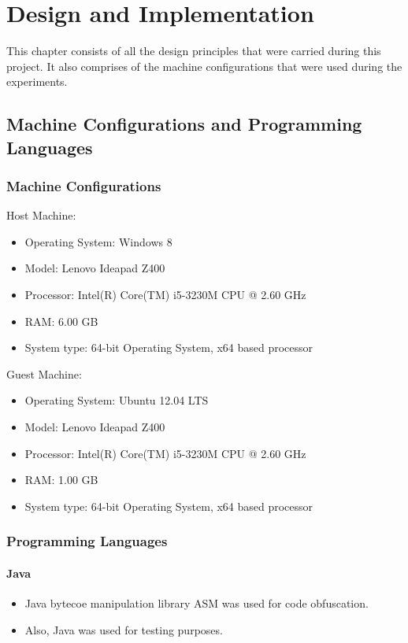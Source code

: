 \chapter{Design and Implementation}
This chapter consists of all the design principles that were carried during this project. It also comprises of the machine configurations that were used during the experiments.

\section{Machine Configurations and Programming Languages}
\subsection{Machine Configurations}
Host Machine:
\begin{itemize}
\item Operating System: Windows 8
\item Model: Lenovo Ideapad Z400
\item Processor: Intel(R) Core(TM) i5-3230M CPU @ 2.60 GHz
\item RAM: 6.00 GB
\item System type: 64-bit Operating System, x64 based processor
\end{itemize}

Guest Machine:
\begin{itemize}
\item Operating System: Ubuntu 12.04 LTS
\item Model: Lenovo Ideapad Z400
\item Processor: Intel(R) Core(TM) i5-3230M CPU @ 2.60 GHz
\item RAM: 1.00 GB
\item System type: 64-bit Operating System, x64 based processor
\end{itemize}

\subsection{Programming Languages}
\subsubsection{Java}
\begin{itemize}
\item Java bytecoe manipulation library ASM was used for code obfuscation.
\item Also, Java was used for testing purposes.
\end{itemize}

